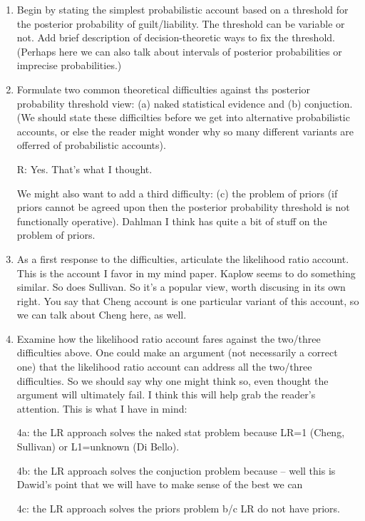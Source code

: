 \documentclass[10pt,dvipsnames,enabledeprecatedfontcommands]{scrartcl}
\begin{document}
\begin{enumerate}

\item Begin by stating the simplest probabilistic account based on a threshold for the 
posterior probability of guilt/liability. The threshold can be variable or not. Add brief description of decision-theoretic ways to fix the threshold. (Perhaps here we can also 
talk about intervals of posterior probabilities or imprecise probabilities.) 


\item Formulate two common theoretical difficulties against ths posterior 
probability threshold view: (a) naked statistical evidence and (b) conjuction.
(We should state these difficilties before we get 
into alternative probabilistic accounts, or else the reader might 
wonder why so many different variants are offerred of probabilistic accounts). 

R: Yes. That's what I thought.


We might also want to add a third difficulty: (c) the problem of priors (if priors cannot be agreed 
upon then the posterior probability threshold is not functionally operative). Dahlman I think has quite a bit of stuff on the problem of priors. 

\item  As a first response to the difficulties, articulate the likelihood ratio account. 
This is the account I favor in my mind paper. Kaplow seems to do something similar. So does Sullivan. So it's a  popular view, worth discusing in its own right. You say that Cheng account is one particular variant of this account, so we can talk about Cheng here, as well.

\item Examine how the likelihood ratio account fares against the two/three difficulties above. One could make an argument (not necessarily a correct one) that the likelihood ratio account can address all the two/three difficulties. So we should say why one might think so, even thought the argument will ultimately fail. I think this will help grab the reader's attention. This is what I have in mind:

4a: the LR approach solves the naked stat problem because LR=1 (Cheng, Sullivan) or L1=unknown (Di Bello). 

4b: the LR approach solves the conjuction problem because -- well this is Dawid's point that we will have to make sense of the best we can

4c: the LR approach solves the priors problem b/c LR do not have priors.



\end{enumerate}
\end{document}
